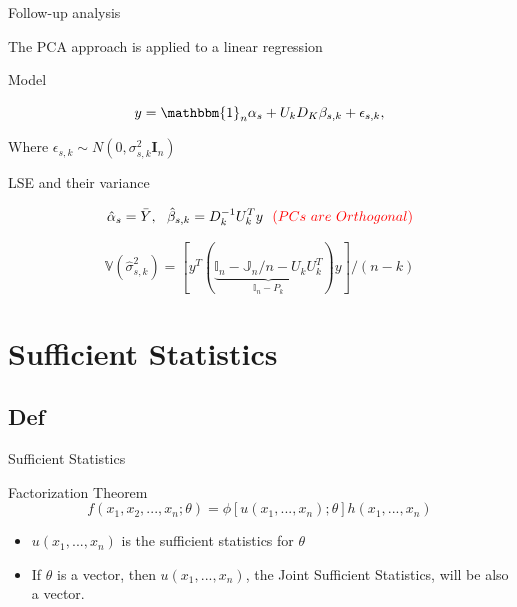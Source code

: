 \documentclass[ignorenonframetext,]{beamer}
\providecommand{\tightlist}{%
  \setlength{\itemsep}{0pt}\setlength{\parskip}{0pt}}
\begin{document}
\begin{frame}{Follow-up analysis}

The PCA approach is applied to a linear regression

\begin{block}{Model}

\[
  y = \mathbbm{1}_{n}\alpha_s + U_kD_K\beta_{s,k} + \epsilon_{s,k},
\]

Where \(\epsilon_{s,k} \sim N(0, \sigma^2_{s,k}\pmb{I}_n)\)

\end{block}

\begin{block}{LSE and their variance}

\[
  \hat{\alpha}_s = \bar{Y},~~ \hat{\beta}_{s,k} = D_k^{-1}U_k^Ty  ~~\textcolor{red}{(PCs~are~ Orthogonal)}
\]

\[
  \mathbb{V}(\hat{\sigma}_{s,k}^2) = [y^T(\underbrace{\mathbb{I}_n - \mathbb{J}_n/n - U_kU_k^T}_{\mathbb{I}_n - P_k})y]/(n-k)
\]

\end{block}

\end{frame}

\section{Sufficient Statistics}\label{sufficient-statistics}

\subsection{Def}\label{def}

\begin{frame}{Sufficient Statistics}

\begin{block}{Factorization Theorem}
\[
  f(x_1, x_2, ... , x_n;\theta) =\phi\left[u(x_1, ... , x_n);\theta \right] h(x_1, ... , x_n)
\]

\end{block}

\begin{itemize}
\tightlist
\item
  \(u(x_1, ... , x_n)\) is the sufficient statistics for \(\theta\)
\item
  If \(\theta\) is a vector, then \(u(x_1, ... , x_n)\), the Joint
  Sufficient Statistics, will be also a vector.
\end{itemize}

\end{frame}
\end{document}
